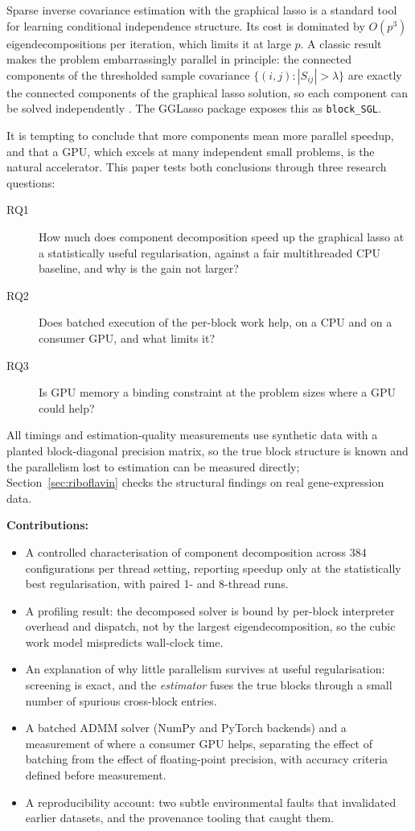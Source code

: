\documentclass[conference]{IEEEtran}
\begin{document}
Sparse inverse covariance estimation with the graphical lasso
\cite{friedman2008,banerjee2008} is a standard tool for learning conditional
independence structure. Its cost is dominated by $O(p^3)$
eigendecompositions per iteration, which limits it at large $p$.
A classic result makes the problem embarrassingly parallel in principle:
the connected components of the thresholded sample covariance
$\{(i,j): |S_{ij}|>\lambda\}$ are exactly the connected components of the
graphical lasso solution, so each component can be solved independently
\cite{witten2011,mazumder2012}. The GGLasso package \cite{gglasso2021} exposes
this as \texttt{block\_SGL}.

It is tempting to conclude that more components mean more parallel speedup,
and that a GPU, which excels at many independent small problems, is the
natural accelerator. This paper tests both conclusions through three
research questions:
\begin{description}
\item[RQ1] How much does component decomposition speed up the graphical lasso
  at a statistically useful regularisation, against a fair multithreaded CPU
  baseline, and why is the gain not larger?
\item[RQ2] Does batched execution of the per-block work help, on a CPU and on
  a consumer GPU, and what limits it?
\item[RQ3] Is GPU memory a binding constraint at the problem sizes where a GPU
  could help?
\end{description}
All timings and estimation-quality measurements use synthetic data with a
planted block-diagonal precision matrix, so the true block structure is known
and the parallelism lost to estimation can be measured directly;
Section~\ref{sec:riboflavin} checks the structural findings on real
gene-expression data.

\textbf{Contributions:}
\begin{itemize}
\item A controlled characterisation of component decomposition across
  384 configurations per thread setting, reporting speedup only at the
  statistically best regularisation, with paired 1- and 8-thread runs.
\item A profiling result: the decomposed solver is bound by per-block
  interpreter overhead and dispatch, not by the largest eigendecomposition,
  so the cubic work model mispredicts wall-clock time.
\item An explanation of why little parallelism survives at useful
  regularisation: screening is exact, and the \emph{estimator} fuses the true
  blocks through a small number of spurious cross-block entries.
\item A batched ADMM solver (NumPy and PyTorch backends) and a measurement of
  where a consumer GPU helps, separating the effect of batching from the
  effect of floating-point precision, with accuracy criteria defined before measurement.
\item A reproducibility account: two subtle environmental faults that
  invalidated earlier datasets, and the provenance tooling that caught them.
\end{itemize}
\end{document}
